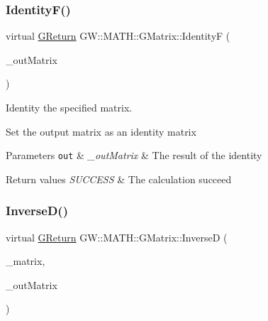 \subsubsection{\texorpdfstring{Identity\+F()}{IdentityF()}}
{\footnotesize\ttfamily virtual \hyperlink{namespaceGW_a67a839e3df7ea8a5c5686613a7a3de21}{G\+Return} G\+W\+::\+M\+A\+T\+H\+::\+G\+Matrix\+::\+IdentityF (\begin{DoxyParamCaption}\item[{\hyperlink{structGW_1_1MATH_1_1GMATRIXF}{G\+M\+A\+T\+R\+I\+XF} \&}]{\+\_\+out\+Matrix }\end{DoxyParamCaption})\hspace{0.3cm}{\ttfamily [pure virtual]}}



Identity the specified matrix. 

Set the output matrix as an identity matrix


\begin{DoxyParams}[1]{Parameters}
\mbox{\tt out}  & {\em \+\_\+out\+Matrix} & The result of the identity\\
\hline
\end{DoxyParams}

\begin{DoxyRetVals}{Return values}
{\em S\+U\+C\+C\+E\+SS} & The calculation succeed \\
\hline
\end{DoxyRetVals}
\mbox{\label{classGW_1_1MATH_1_1GMatrix_ade39ff1c70cb06889196893aad819244}} 
\subsubsection{\texorpdfstring{Inverse\+D()}{InverseD()}}
{\footnotesize\ttfamily virtual \hyperlink{namespaceGW_a67a839e3df7ea8a5c5686613a7a3de21}{G\+Return} G\+W\+::\+M\+A\+T\+H\+::\+G\+Matrix\+::\+InverseD (\begin{DoxyParamCaption}\item[{\hyperlink{structGW_1_1MATH_1_1GMATRIXD}{G\+M\+A\+T\+R\+I\+XD}}]{\+\_\+matrix,  }\item[{\hyperlink{structGW_1_1MATH_1_1GMATRIXD}{G\+M\+A\+T\+R\+I\+XD} \&}]{\+\_\+out\+Matrix }\end{DoxyParamCaption})\hspace{0.3cm}{\ttfamily [pure virtual]}}



